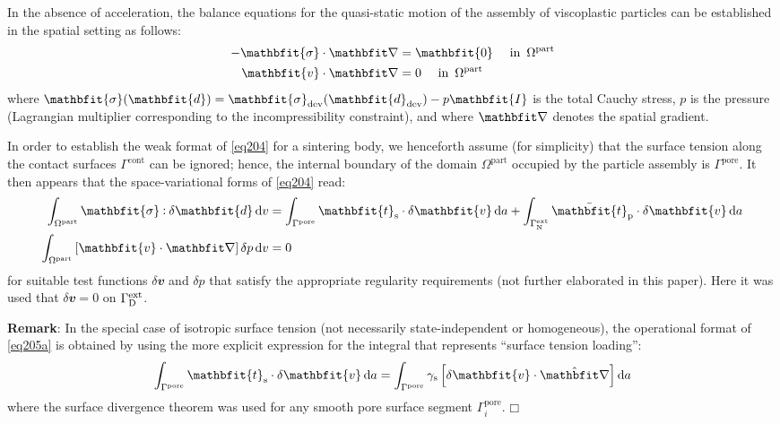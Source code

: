 \documentclass[10pt,a4paper,fleqn]{article}
\renewcommand{\ta}[1]{\mathbfit{#1}}
\renewcommand{\ts}[1]{\mathbfit{#1}}
\renewcommand{\Box}{\mdlgwhtsquare}
\newcommand{\pore}{\mathrm{pore}}
\newcommand{\particle}{\mathrm{part}}
\newcommand{\prescribed}{\mathrm{p}}
\newcommand{\contact}{\mathrm{cont}}
\newcommand{\external}{\mathrm{ext}}
\newcommand{\internal}{\mathrm{int}}
\newcommand{\surf}{\mathrm{s}}
\begin{document}
In the absence of acceleration, the balance equations for the quasi-static motion of the assembly of viscoplastic particles can be established in the spatial setting as follows:
\begin{subequations}\label{eq204}
\begin{align}
    -\ts{\sigma}\cdot\diff & = \ts{0} \quad \mbox{ in }\,\Omega^\particle
\label{eq204a}
\\
    \ta{v}\cdot\diff & = 0 \quad \mbox{ in }\,\Omega^\particle
\label{eq204b}
\end{align}
\end{subequations}
where $\ts{\sigma}(\ts{d})=\ts{\sigma}_\dev(\ts{d}_\dev)-p\ts{I}$ is the total Cauchy stress, $p$ is the pressure (Lagrangian multiplier corresponding to the incompressibility constraint), and
where $\diff$ denotes the spatial gradient.

In order to establish the weak format of \eqref{eq204} for a sintering body, we henceforth assume (for simplicity) that the surface tension along the contact surfaces $\Gamma^\contact$ can be ignored; hence, the internal boundary of the domain $\Omega^\particle$ occupied by the particle assembly is $\Gamma^\pore$. It then appears that the space-variational forms of \eqref{eq204} read:
\begin{subequations}\label{eq205}
\begin{align}
    \int_{\Omega^\particle} \ts{\sigma}\dprod\delta \ts{d} \dif v
    & =
    \int_{\Gamma^\pore} \ta{t}_\surf \cdot \delta\ta{v} \dif a
    + \int_{\Gamma^\external_\Neumann} \bar{\ta t}_\prescribed\cdot\delta \ta{v} \dif a
\label{eq205a} \\
    \int_{\Omega^\particle} \left[\ta{v}\cdot\diff\right] \delta p \dif v
    & =  0
\label{eq205b}
\end{align}
\end{subequations}
for suitable test functions $\delta\ta{v}$ and $\delta p$ that satisfy the appropriate regularity requirements (not further elaborated in this paper). Here it was used that $\delta\ta{v}=\ta{0}$ on $\Gamma^\external_\Dirichlet$.

\textbf{Remark}: In the special case of isotropic surface tension (not necessarily state-independent or homogeneous), the operational format of \eqref{eq205a} is obtained by using the more explicit expression for the integral that represents ``surface tension loading'':
\begin{equation}
    \int_{\Gamma^\pore} \ta{t}_\surf \cdot \delta\ta{v} \dif a =
    \int_{\Gamma^\pore} \gamma_\surf\left[\delta\ta{v}\cdot\hat{\diff}\right] \dif a
\label{eq206}
\end{equation}
where the surface divergence theorem was used for any smooth pore surface segment $\Gamma^\pore_i$. $\Box$
\end{document}
